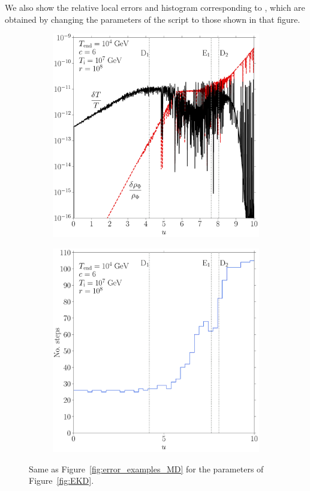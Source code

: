 \documentclass[11pt,a4paper]{article}
\begin{document}
We also show the relative local errors and histogram corresponding to , which are obtained by changing the parameters of the script to those shown in that figure.   
%
\begin{figure}[t]
	\begin{subfigure}{0.5\textwidth}
		\includegraphics[width=1\textwidth]{EKD_err.pdf}
		\caption{}
		\label{fig:EKD_err}
	\end{subfigure}
	\begin{subfigure}{0.5\textwidth}
		\includegraphics[width=1\textwidth]{EKD_hist.pdf}
		\caption{}
		\label{fig:EKD_hist}
	\end{subfigure}
	\caption{Same as  Figure~\ref{fig:error_examples_MD} for the parameters of Figure~\ref{fig:EKD}.}
	\label{fig:error_examples_KD}
\end{figure}
\end{document}
